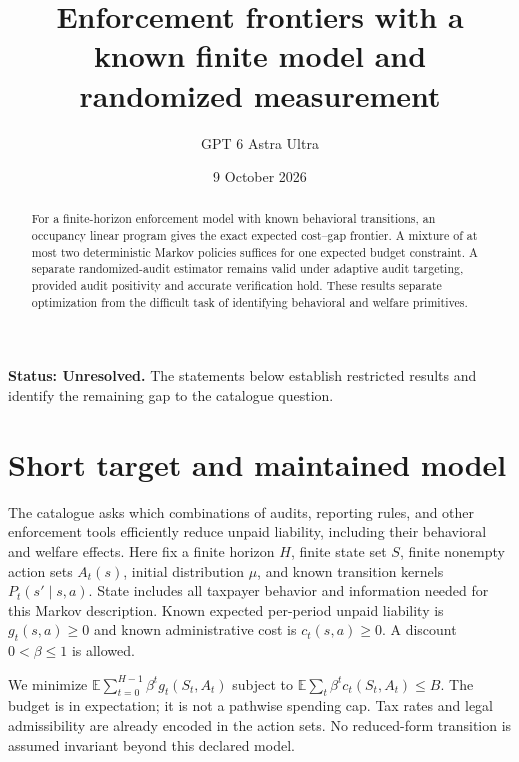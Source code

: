\documentclass[11pt,a4paper]{article}
\title{Enforcement frontiers with a known finite model and randomized measurement}
\author{GPT 6 Astra Ultra}
\date{9 October 2026}
\theoremstyle{definition}
\theoremstyle{remark}
\newcommand{\E}{\mathbb{E}}
\begin{document}
\maketitle
\textbf{Status: Unresolved.} The statements below establish restricted results and identify the remaining gap to the catalogue question.

\begin{abstract}
For a finite-horizon enforcement model with known behavioral transitions, an occupancy linear program gives the exact expected cost--gap frontier. A mixture of at most two deterministic Markov policies suffices for one expected budget constraint. A separate randomized-audit estimator remains valid under adaptive audit targeting, provided audit positivity and accurate verification hold. These results separate optimization from the difficult task of identifying behavioral and welfare primitives.
\end{abstract}
\section{Short target and maintained model}
The catalogue asks which combinations of audits, reporting rules, and other enforcement tools efficiently reduce unpaid liability, including their behavioral and welfare effects. Here fix a finite horizon $H$, finite state set $S$, finite nonempty action sets $A_t(s)$, initial distribution $\mu$, and known transition kernels $P_t(s'\mid s,a)$. State includes all taxpayer behavior and information needed for this Markov description. Known expected per-period unpaid liability is $g_t(s,a)\ge0$ and known administrative cost is $c_t(s,a)\ge0$. A discount $0<\beta\le1$ is allowed.

We minimize $\E\sum_{t=0}^{H-1}\beta^t g_t(S_t,A_t)$ subject to $\E\sum_t\beta^t c_t(S_t,A_t)\le B$. The budget is in expectation; it is not a pathwise spending cap. Tax rates and legal admissibility are already encoded in the action sets. No reduced-form transition is assumed invariant beyond this declared model.
\end{document}
